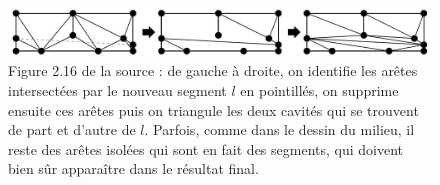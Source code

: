 \documentclass[12pt,a4paper]{report}
\begin{document}
\begin{figure}[htbp]
\begin{center}
\includegraphics[scale=0.4]{insertingASegment.jpg}
\caption{Figure 2.16 de la source \cite{delnotes} : de gauche à droite, on identifie les arêtes intersectées par le nouveau segment $l$ en pointillés, on supprime ensuite ces arêtes puis on triangule les deux cavités qui se trouvent de part et d'autre de $l$. Parfois, comme dans le dessin du milieu, il reste des arêtes isolées qui sont en fait des segments, qui doivent bien sûr apparaître dans le résultat final.}
\label{inserting_a_segment}
\end{center}
\end{figure}
\end{document}
